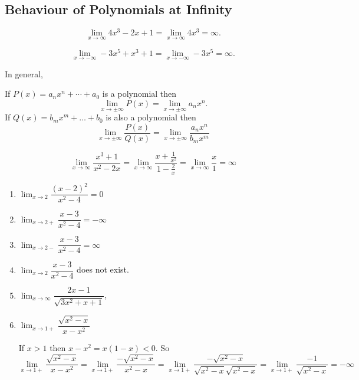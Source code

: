 \documentclass[calc1-main.tex]{subfiles}
\begin{document}
  \subsection*{Behaviour of Polynomials at Infinity}
  \begin{example}
    \[
      \lim_{x \to \infty} 4x^3 - 2x + 1 =
      \lim_{x \to \infty} 4x^3 = \infty.
    \]

    \[
      \lim_{x \to -\infty} -3x^5 + x^3 +1 =
      \lim_{x \to -\infty} -3 x^5 = \infty.
    \]
  \end{example}
  In general,
  \begin{theorem}
    If $P(x) = a_n x^n + \cdots + a_0$ is a polynomial then
    \[
      \lim_{x \to \pm \infty} P(x) = \lim_{x \to \pm \infty} a_n x^n.
    \]
    If $Q(x) = b_m x^m + \dots + b_0$ is also a polynomial then
    \[
      \lim_{x \to \pm \infty} \frac{P(x)}{Q(x)}= \lim_{x \to \pm \infty} \frac{a_n x^n}{b_m x^m}
    \]
  \end{theorem}

  \begin{example}
    \[
      \lim_{x \to \infty} \frac{x^3+1}{x^2-2x} =
      \lim_{x \to \infty} \frac{x+\frac{1}{x^2}}{1-\frac{2}{x}} = \lim_{x \to \infty} \frac{x}{1} = \infty
    \]
  \end{example}

  \begin{example}
    \begin{enumerate}
      \item $\lim_{x \to 2} \dfrac{(x-2)^2}{x^2-4} = 0$
      \item $\lim_{x \to 2+} \dfrac{x-3}{x^2-4} = -\infty$
      \item $\lim_{x \to 2-} \dfrac{x-3}{x^2-4} = \infty$
      \item $\lim_{x \to 2} \dfrac{x-3}{x^2-4}$ does not exist.
      \item $\lim_{x \to \infty} \dfrac{2x-1}{\sqrt{3x^2+x+1}}$,
      \item $\lim_{x \to 1+} \dfrac{\sqrt{x^2-x}}{x-x^2}$
      \begin{solution}
        If $x>1$ then $x-x^2 = x(1-x) < 0$. So
        \[
          \lim_{x \to 1+} \dfrac{\sqrt{x^2-x}}{x-x^2} =
          \lim_{x \to 1+} \dfrac{-\sqrt{x^2-x}}{x^2-x} =
          \lim_{x \to 1+} \dfrac{-\sqrt{x^2-x}}{\sqrt{x^2-x} \sqrt{x^2-x}} =
          \lim_{x \to 1+} \dfrac{-1}{\sqrt{x^2-x}} = -\infty
        \]
      \end{solution}
    \end{enumerate}
  \end{example}
\end{document}
